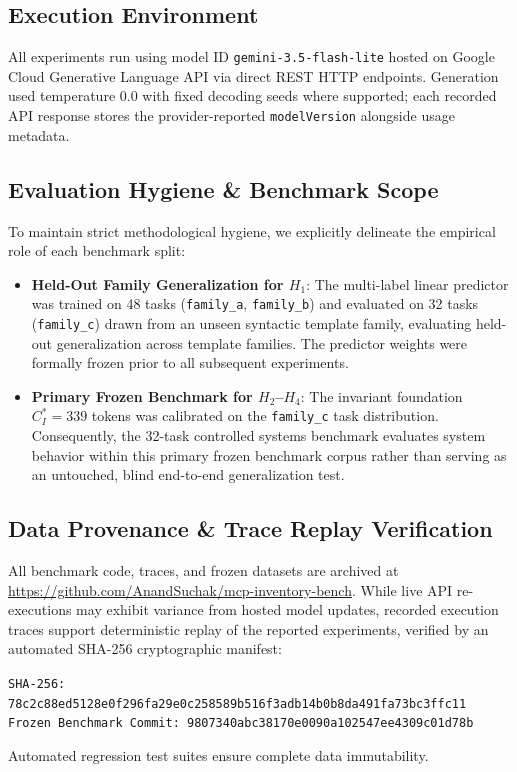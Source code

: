 \subsection{Execution Environment}
All experiments run using model ID \texttt{gemini-3.5-flash-lite} hosted on Google Cloud Generative Language API via direct REST HTTP endpoints. Generation used temperature $0.0$ with fixed decoding seeds where supported; each recorded API response stores the provider-reported \texttt{modelVersion} alongside usage metadata.

\subsection{Evaluation Hygiene \& Benchmark Scope}
To maintain strict methodological hygiene, we explicitly delineate the empirical role of each benchmark split:
\begin{itemize}
    \item \textbf{Held-Out Family Generalization for $H_1$}: The multi-label linear predictor was trained on 48 tasks (\texttt{family\_a}, \texttt{family\_b}) and evaluated on 32 tasks (\texttt{family\_c}) drawn from an unseen syntactic template family, evaluating held-out generalization across template families. The predictor weights were formally frozen prior to all subsequent experiments.
    \item \textbf{Primary Frozen Benchmark for $H_2$--$H_4$}: The invariant foundation $C_I^* = 339$ tokens was calibrated on the \texttt{family\_c} task distribution. Consequently, the 32-task controlled systems benchmark evaluates system behavior within this primary frozen benchmark corpus rather than serving as an untouched, blind end-to-end generalization test.
\end{itemize}

\subsection{Data Provenance \& Trace Replay Verification}
All benchmark code, traces, and frozen datasets are archived at \url{https://github.com/AnandSuchak/mcp-inventory-bench}. While live API re-executions may exhibit variance from hosted model updates, recorded execution traces support deterministic replay of the reported experiments, verified by an automated SHA-256 cryptographic manifest:
\begin{center}
{\scriptsize\texttt{SHA-256: 78c2c88ed5128e0f296fa29e0c258589b516f3adb14b0b8da491fa73bc3ffc11}} \\
{\scriptsize\texttt{Frozen Benchmark Commit: 9807340abc38170e0090a102547ee4309c01d78b}}
\end{center}
Automated regression test suites ensure complete data immutability.

